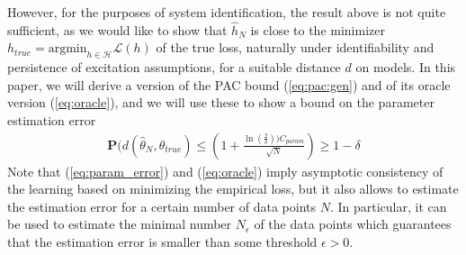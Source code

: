 \documentclass{ifacconf}
\def\eqref#1{(\ref{#1})}
\newcommand{\bP}{\mathbf{P}}
\begin{document}
However, for the purposes of system identification, the result above is not
quite sufficient,  as we would like to show that $\hat{h}_N$ is close to the minimizer $h_{true}=\mathrm{argmin}_{h \in \mathcal{H}} \mathcal{L}(h)$ 
of the true loss, 
naturally under identifiability and persistence of excitation assumptions, for a suitable distance $d$ on models. 
In this paper, we will derive a version of the PAC bound \eqref{eq:pac:gen} and of its oracle version \eqref{eq:oracle}, and we will use
these to show a bound on the parameter estimation error
\begin{equation}
  \label{eq:param_error}
  \begin{split}
\bP(d(\hat{\theta}_N,\theta_{true}) \le (1+\frac{\ln(\frac{2}{\delta}))C_{param}}{\sqrt{N}}) \ge 1-\delta 
\end{split}
\end{equation}
Note that \eqref{eq:param_error} and \eqref{eq:oracle} imply asymptotic consistency of the learning based on minimizing the empirical loss, but it also
allows to estimate the estimation error for a certain number of data points $N$. In particular, it can be used to estimate the minimal
number $N_{\epsilon}$ of the data points which guarantees that the estimation error is smaller than some threshold $\epsilon > 0$. 
\end{document}

